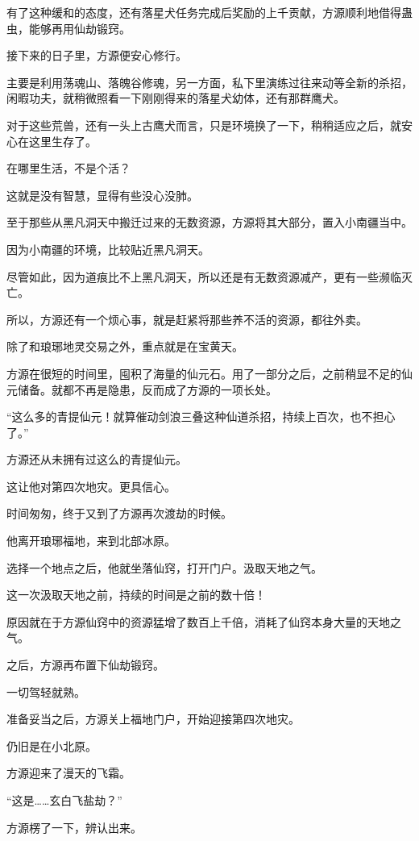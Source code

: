 \begin{this_body}
有了这种缓和的态度，还有落星犬任务完成后奖励的上千贡献，方源顺利地借得蛊虫，能够再用仙劫锻窍。

接下来的日子里，方源便安心修行。

主要是利用荡魂山、落魄谷修魂，另一方面，私下里演练过往来动等全新的杀招，闲暇功夫，就稍微照看一下刚刚得来的落星犬幼体，还有那群鹰犬。

对于这些荒兽，还有一头上古鹰犬而言，只是环境换了一下，稍稍适应之后，就安心在这里生存了。

在哪里生活，不是个活？

这就是没有智慧，显得有些没心没肺。

至于那些从黑凡洞天中搬迁过来的无数资源，方源将其大部分，置入小南疆当中。

因为小南疆的环境，比较贴近黑凡洞天。

尽管如此，因为道痕比不上黑凡洞天，所以还是有无数资源减产，更有一些濒临灭亡。

所以，方源还有一个烦心事，就是赶紧将那些养不活的资源，都往外卖。

除了和琅琊地灵交易之外，重点就是在宝黄天。

方源在很短的时间里，囤积了海量的仙元石。用了一部分之后，之前稍显不足的仙元储备。就都不再是隐患，反而成了方源的一项长处。

“这么多的青提仙元！就算催动剑浪三叠这种仙道杀招，持续上百次，也不担心了。”

方源还从未拥有过这么的青提仙元。

这让他对第四次地灾。更具信心。

时间匆匆，终于又到了方源再次渡劫的时候。

他离开琅琊福地，来到北部冰原。

选择一个地点之后，他就坐落仙窍，打开门户。汲取天地之气。

这一次汲取天地之前，持续的时间是之前的数十倍！

原因就在于方源仙窍中的资源猛增了数百上千倍，消耗了仙窍本身大量的天地之气。

之后，方源再布置下仙劫锻窍。

一切驾轻就熟。

准备妥当之后，方源关上福地门户，开始迎接第四次地灾。

仍旧是在小北原。

方源迎来了漫天的飞霜。

“这是……玄白飞盐劫？”

方源楞了一下，辨认出来。


\end{this_body}
